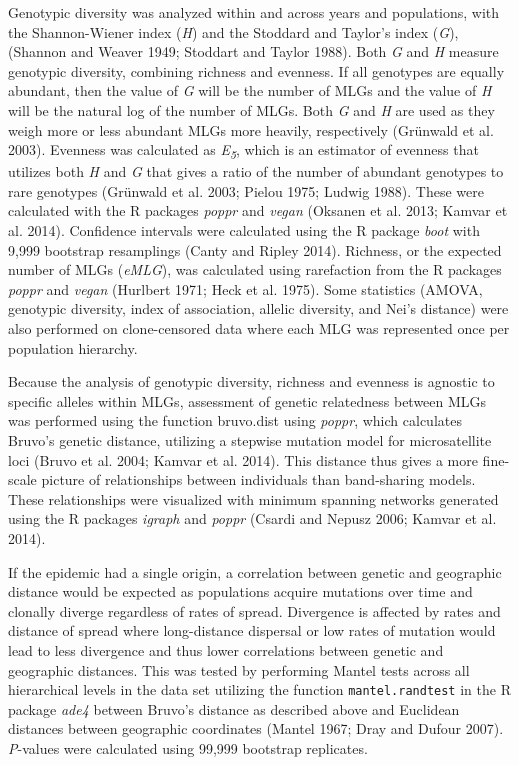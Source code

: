 \documentclass[double,12pt]{beavtex}
\begin{document}
  Genotypic diversity was analyzed within and across years and
  populations, with the Shannon-Wiener index (\emph{H}) and the Stoddard
  and Taylor's index (\emph{G}), (Shannon and Weaver 1949; Stoddart and
  Taylor 1988). Both \emph{G} and \emph{H} measure genotypic diversity,
  combining richness and evenness. If all genotypes are equally abundant,
  then the value of \emph{G} will be the number of MLGs and the value of
  \emph{H} will be the natural log of the number of MLGs. Both \emph{G}
  and \emph{H} are used as they weigh more or less abundant MLGs more
  heavily, respectively (Grünwald et al. 2003). Evenness was calculated as
  \emph{E\textsubscript{5}}, which is an estimator of evenness that
  utilizes both \emph{H} and \emph{G} that gives a ratio of the number of
  abundant genotypes to rare genotypes (Grünwald et al. 2003; Pielou 1975;
  Ludwig 1988). These were calculated with the R packages \emph{poppr} and
  \emph{vegan} (Oksanen et al. 2013; Kamvar et al. 2014). Confidence
  intervals were calculated using the R package \emph{boot} with 9,999
  bootstrap resamplings (Canty and Ripley 2014). Richness, or the expected
  number of MLGs (\emph{eMLG}), was calculated using rarefaction from the
  R packages \emph{poppr} and \emph{vegan} (Hurlbert 1971; Heck et al.
  1975). Some statistics (AMOVA, genotypic diversity, index of
  association, allelic diversity, and Nei's distance) were also performed
  on clone-censored data where each MLG was represented once per
  population hierarchy.
  
  Because the analysis of genotypic diversity, richness and evenness is
  agnostic to specific alleles within MLGs, assessment of genetic
  relatedness between MLGs was performed using the function bruvo.dist
  using \emph{poppr}, which calculates Bruvo's genetic distance, utilizing
  a stepwise mutation model for microsatellite loci (Bruvo et al. 2004;
  Kamvar et al. 2014). This distance thus gives a more fine-scale picture
  of relationships between individuals than band-sharing models. These
  relationships were visualized with minimum spanning networks generated
  using the R packages \emph{igraph} and \emph{poppr} (Csardi and Nepusz
  2006; Kamvar et al. 2014).
  
  If the epidemic had a single origin, a correlation between genetic and
  geographic distance would be expected as populations acquire mutations
  over time and clonally diverge regardless of rates of spread. Divergence
  is affected by rates and distance of spread where long-distance
  dispersal or low rates of mutation would lead to less divergence and
  thus lower correlations between genetic and geographic distances. This
  was tested by performing Mantel tests across all hierarchical levels in
  the data set utilizing the function \texttt{mantel.randtest} in the R
  package \emph{ade4} between Bruvo's distance as described above and
  Euclidean distances between geographic coordinates (Mantel 1967; Dray
  and Dufour 2007). \emph{P}-values were calculated using 99,999 bootstrap
  replicates.
  
\end{document}
